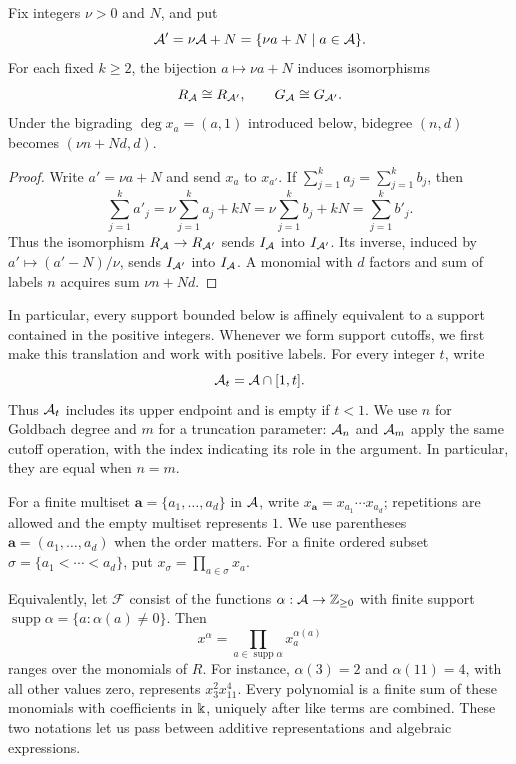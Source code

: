 \begin{proposition}
\label{setup:affine-invariance}
Fix integers $\nu>0$ and $N$, and put
\[
 \mathcal A'=\nu\mathcal A+N=\{\nu a+N\mid a\in\mathcal A\}.
\]
For each fixed $k\ge2$, the bijection $a\mapsto \nu a+N$ induces
isomorphisms
\[
 R_\mathcal A\cong R_{\mathcal A'},\qquad G_\mathcal A\cong G_{\mathcal A'} .
\]
Under the bigrading $\deg x_a=(a,1)$ introduced below, bidegree
$(n,d)$ becomes $(\nu n+Nd,d)$.
\end{proposition}
\begin{proof}
Write $a'=\nu a+N$ and send $x_a$ to $x_{a'}$. If
$\sum_{j=1}^k a_j=\sum_{j=1}^k b_j$, then
\[
 \sum_{j=1}^k a'_j
 =\nu\sum_{j=1}^k a_j+kN
 =\nu\sum_{j=1}^k b_j+kN
 =\sum_{j=1}^k b'_j .
\]
Thus the isomorphism $R_\mathcal A\to R_{\mathcal A'}$ sends $I_\mathcal A$ into $I_{\mathcal A'}$.
Its inverse, induced by $a'\mapsto(a'-N)/\nu$, sends $I_{\mathcal A'}$
into $I_\mathcal A$. A monomial with $d$ factors and sum of labels $n$
acquires sum $\nu n+Nd$.
\end{proof}

In particular, every support bounded below is affinely equivalent
to a support contained in the positive integers. Whenever we form
support cutoffs, we first make this translation and work with positive
labels. For every integer $t$, write
\[
 \mathcal A_t=\mathcal A\cap[1,t].
\]
Thus $\mathcal A_t$ includes its upper endpoint and is empty if $t<1$.
We use $n$ for Goldbach degree and $m$ for a truncation parameter:
$\mathcal A_n$ and $\mathcal A_m$ apply the same cutoff operation, with the index
indicating its role in the argument. In particular, they are equal
when $n=m$.

\begin{remark}
For a finite multiset $\boldsymbol a=\{a_1,\ldots,a_d\}$ in $\mathcal A$, write
$x_{\boldsymbol a}=x_{a_1}\cdots x_{a_d}$; repetitions are allowed and
the empty multiset represents $1$. We use parentheses
$\boldsymbol a=(a_1,\ldots,a_d)$ when the order matters. For a finite
ordered subset $\sigma=\{a_1<\cdots<a_d\}$, put
$x_\sigma=\prod_{a\in\sigma}x_a$.

Equivalently, let $\mathcal F$ consist of the functions
$\alpha:\mathcal A\to\mathbb Z_{\ge0}$ with finite support
$\operatorname{supp}\alpha=\{a:\alpha(a)\ne0\}$. Then
\[
 x^\alpha=\prod_{a\in\operatorname{supp}\alpha}x_a^{\alpha(a)}
\]
ranges over the monomials of $R$. For instance, $\alpha(3)=2$ and
$\alpha(11)=4$, with all other values zero, represents $x_3^2x_{11}^4$.
Every polynomial is a finite sum of these monomials with coefficients
in $\Bbbk$, uniquely after like terms are combined. These two notations
let us pass between additive representations and algebraic expressions.
\end{remark}

